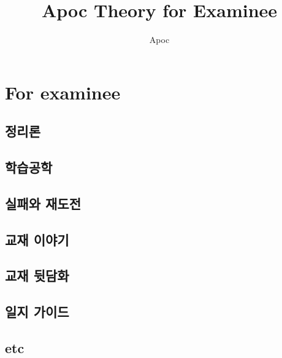 \documentclass[oneside,11pt,chapter]{oblivoir}%
\title{Apoc Theory for Examinee}
\author{Apoc}
\begin{document}
 

    \maketitle

    



    \tableofcontents

    \newpage
    \part{For examinee}

    \chapter{정리론}

    
    
    \chapter{학습공학}
    
    
    

    \chapter{실패와 재도전}
    
    
    \chapter{교재 이야기}
    
    
    \chapter{교재 뒷담화}
    

    \chapter{일지 가이드}
    

    \chapter{etc}
    
\end{document}
